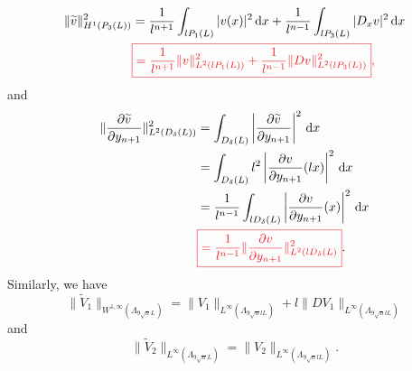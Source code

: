 \documentclass[12pt]{amsart}
\renewcommand{\d}{\,\mathrm{d}}
\theoremstyle{definition}
\begin{document}
\begin{equation}\label{term-2}
	\begin{aligned}
		\|\widetilde{v}\|^2_{H^{1}(P_3(L))}&= \frac{1}{l^{n+1}} \int_{lP_1(L)} |v(x)|^2\d x+ \frac{1}{l^{n-1}}\int_{lP_3(L)} |D_xv|^2\d x\\
						   &\textcolor{Red}{\boxed{= \frac{1}{l^{n+1}}\|v\|^2_{L^2(l P_1(L))}+\frac{1}{l^{n-1}}\|Dv\|^2_{L^2(lP_3(L))}},}
	\end{aligned}
\end{equation}
and
\begin{equation}\label{term-3}
	\begin{aligned}
		\|\frac{\partial \widetilde{v}}{\partial y_{n+1}} \|^2_{L^2\left( D_{\delta}(L) \right) }&= \int_{D_\delta(L)}\left| \frac{\partial \widetilde{v}}{\partial y_{n+1}}  \right| ^2\d x\\
													 &= \int_{D_{\delta}(L)}l^2\left| \frac{\partial v}{\partial y_{n+1}} (lx) \right|^2\d x\\
													 &= \frac{1}{l^{n-1}}\int_{lD_\delta(L)}\left| \frac{\partial v}{\partial y_{n+1}} (x) \right| ^2\d x\\
													 &\textcolor{Red}{\boxed{= \frac{1}{l^{n-1}}\|\frac{\partial v}{\partial y_{n+1}} \|^2_{L^2(lD_\delta(L)}}}.
	\end{aligned} 
\end{equation}
Similarly, we have
\begin{equation}\label{potential-1}
	\|\widetilde{V}_1\|_{W^{1,\infty}\left( \Lambda_{9 \sqrt{n} L} \right) }= \|V_1\|_{L^{\infty}(\Lambda_{9\sqrt{n} lL})}+l \|DV_1\|_{L^{\infty}\left( \Lambda_{9\sqrt{n} lL} \right) }
\end{equation}
and
\begin{equation}\label{potential-2}
	\|\widetilde{V}_2\|_{L^{\infty}(\Lambda_{9\sqrt{n} L})}= \|V_2\|_{L^{\infty}\left( \Lambda_{9\sqrt{n} lL} \right) }.
\end{equation}
\end{document}
